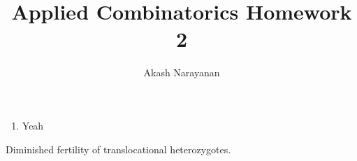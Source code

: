 \documentclass[12pt]{article}
\title{Applied Combinatorics Homework 2}
\author{Akash Narayanan}
\begin{document}
 \maketitle

 \begin{enumerate}
   \item Yeah 
 \end{enumerate}

 Diminished fertility of translocational heterozygotes.
\end{document}
